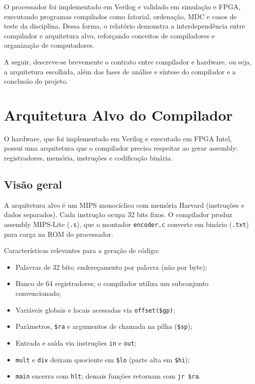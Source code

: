 \documentclass[
	12pt,				%
	openright,			%
	a4paper,			%
	english,			%
	french,				%
	spanish,			%
	brazil,				%
	]{abntex2}
\begin{document}
O processador foi implementado em Verilog e validado em simulação e FPGA, executando programas compilados como fatorial, ordenação, MDC e casos de teste da disciplina. Dessa forma, o relatório demonstra a interdependência entre compilador e arquitetura alvo, reforçando conceitos de compiladores e organização de computadores.

A seguir, descreve-se brevemente o contrato entre compilador e hardware, ou seja, a arquitetura escolhida, além das fases de análise e síntese do compilador e a conclusão do projeto.

\chapter{Arquitetura Alvo do Compilador}

O hardware, que foi implementado em Verilog e executado em FPGA Intel, possui uma arquitetura que o compilador precisa respeitar ao gerar assembly: registradores, memória, instruções e codificação binária.

\section{Visão geral}

A arquitetura alvo é um MIPS monocíclico com memória Harvard (instruções e dados separados). Cada instrução ocupa 32 bits fixos. O compilador produz assembly MIPS-Lite (\texttt{.s}), que o montador \texttt{encoder.c} converte em binário (\texttt{.txt}) para carga na ROM do processador.

Características relevantes para a geração de código:
\begin{itemize}
    \item Palavras de 32 bits; endereçamento por palavra (não por byte);
    \item Banco de 64 registradores; o compilador utiliza um subconjunto convencionado;
    \item Variáveis globais e locais acessadas via \texttt{offset(\$gp)};
    \item Parâmetros, \texttt{\$ra} e argumentos de chamada na pilha (\texttt{\$sp});
    \item Entrada e saída via instruções \texttt{in} e \texttt{out};
    \item \texttt{mult} e \texttt{div} deixam quociente em \texttt{\$lo} (parte alta em \texttt{\$hi});
    \item \texttt{main} encerra com \texttt{hlt}; demais funções retornam com \texttt{jr \$ra}.
\end{itemize}
\end{document}
